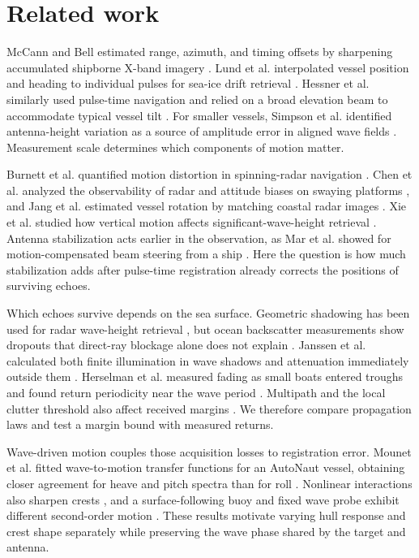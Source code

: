 \section{Related work}
McCann and Bell estimated range, azimuth, and timing offsets by sharpening accumulated shipborne X-band imagery \cite{McCann2018OffsetCalibration}. Lund et al. interpolated vessel position and heading to individual pulses for sea-ice drift retrieval \cite{Lund2018SeaIceDrift}. Hessner et al. similarly used pulse-time navigation and relied on a broad elevation beam to accommodate typical vessel tilt \cite{Hessner2019Reliability}. For smaller vessels, Simpson et al. identified antenna-height variation as a source of amplitude error in aligned wave fields \cite{Simpson2020Forecasting}. Measurement scale determines which components of motion matter.

Burnett et al. quantified motion distortion in spinning-radar navigation \cite{Burnett2021MotionDistortion}. Chen et al. analyzed the observability of radar and attitude biases on swaying platforms \cite{Chen2014Registration}, and Jang et al. estimated vessel rotation by matching coastal radar images \cite{Jang2024MaritimeOdometry}. Xie et al. studied how vertical motion affects significant-wave-height retrieval \cite{Xie2019WaveCompensation}. Antenna stabilization acts earlier in the observation, as Mar et al. showed for motion-compensated beam steering from a ship \cite{Mar2013Motion}. Here the question is how much stabilization adds after pulse-time registration already corrects the positions of surviving echoes.

Which echoes survive depends on the sea surface. Geometric shadowing has been used for radar wave-height retrieval \cite{Wijaya2016Shadowing}, but ocean backscatter measurements show dropouts that direct-ray blockage alone does not explain \cite{Plant2012WaveShadowing}. Janssen et al. calculated both finite illumination in wave shadows and attenuation immediately outside them \cite{Janssen2026Diffraction}. Herselman et al. measured fading as small boats entered troughs and found return periodicity near the wave period \cite{Herselman2008SmallBoat}. Multipath and the local clutter threshold also affect received margins \cite{Rohling1983RadarCFAR}. We therefore compare propagation laws and test a margin bound with measured returns.

Wave-driven motion couples those acquisition losses to registration error. Mounet et al. fitted wave-to-motion transfer functions for an AutoNaut vessel, obtaining closer agreement for heave and pitch spectra than for roll \cite{Mounet2024Hydrodynamic}. Nonlinear interactions also sharpen crests \cite{Tayfun1980Nonlinear,Forristall2000Crest}, and a surface-following buoy and fixed wave probe exhibit different second-order motion \cite{McAllister2019Lagrangian}. These results motivate varying hull response and crest shape separately while preserving the wave phase shared by the target and antenna.
